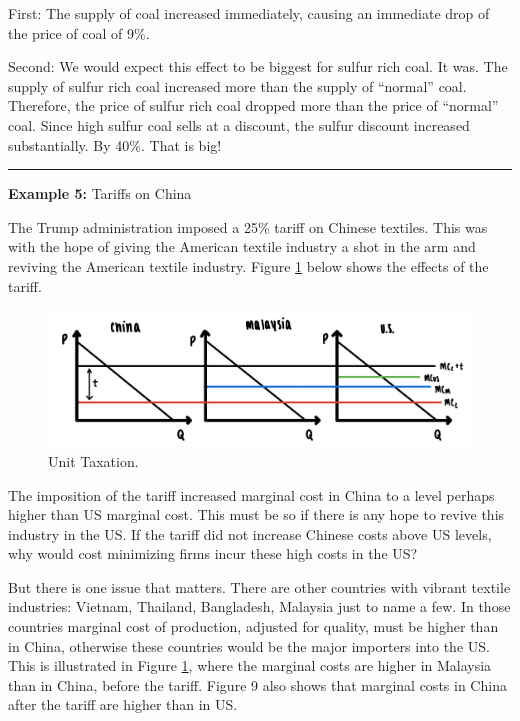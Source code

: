 \documentclass[
]{book}
\begin{document}
First: The supply of coal increased immediately, causing an immediate drop of the price of coal of 9\%.

Second: We would expect this effect to be biggest for sulfur rich coal. It was. The supply of sulfur rich coal increased more than the supply of ``normal'' coal. Therefore, the price of sulfur rich coal dropped more than the price of ``normal'' coal. Since high sulfur coal sells at a discount, the sulfur discount increased substantially. By 40\%. That is big!

\begin{center}\rule{0.5\linewidth}{0.5pt}\end{center}

\textbf{Example 5:} Tariffs on China

The Trump administration imposed a 25\% tariff on Chinese textiles. This was with the hope of giving the American textile industry a shot in the arm and reviving the American textile industry. Figure \ref{fig:compmarkets09} below shows the effects of the tariff.

\begin{figure}

{\centering \includegraphics[width=0.9\linewidth]{img/compmarkets/fig9} 

}

\caption{Unit Taxation.}\label{fig:compmarkets09}
\end{figure}

The imposition of the tariff increased marginal cost in China to a level perhaps higher than US marginal cost. This must be so if there is any hope to revive this industry in the US. If the tariff did not increase Chinese costs above US levels, why would cost minimizing firms incur these high costs in the US?

But there is one issue that matters. There are other countries with vibrant textile industries: Vietnam, Thailand, Bangladesh, Malaysia just to name a few. In those countries marginal cost of production, adjusted for quality, must be higher than in China, otherwise these countries would be the major importers into the US. This is illustrated in Figure \ref{fig:compmarkets09}, where the marginal costs are higher in Malaysia than in China, before the tariff. Figure 9 also shows that marginal costs in China after the tariff are higher than in US.
\end{document}
